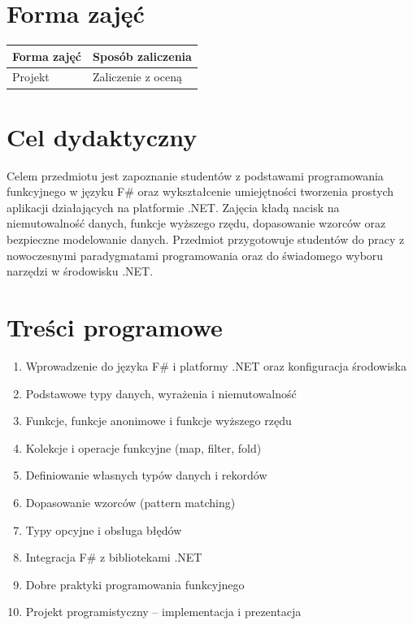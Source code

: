 \documentclass[12pt, a4paper]{article}
\begin{document}
\section{Forma zajęć}

\begin{tabular}{ll}
  \hline
  \textbf{Forma zajęć} & \textbf{Sposób zaliczenia} \\
  \hline
  Projekt & Zaliczenie z oceną \\
  \hline
\end{tabular}

\section{Cel dydaktyczny}

Celem przedmiotu jest zapoznanie studentów z podstawami programowania funkcyjnego w języku F\# oraz wykształcenie umiejętności tworzenia prostych aplikacji działających na platformie .NET. Zajęcia kładą nacisk na niemutowalność danych, funkcje wyższego rzędu, dopasowanie wzorców oraz bezpieczne modelowanie danych. Przedmiot przygotowuje studentów do pracy z nowoczesnymi paradygmatami programowania oraz do świadomego wyboru narzędzi w środowisku .NET.

\section{Treści programowe}

\begin{enumerate}
  \item Wprowadzenie do języka F\# i platformy .NET oraz konfiguracja środowiska
  \item Podstawowe typy danych, wyrażenia i niemutowalność
  \item Funkcje, funkcje anonimowe i funkcje wyższego rzędu
  \item Kolekcje i operacje funkcyjne (map, filter, fold)
  \item Definiowanie własnych typów danych i rekordów
  \item Dopasowanie wzorców (pattern matching)
  \item Typy opcyjne i obsługa błędów
  \item Integracja F\# z bibliotekami .NET
  \item Dobre praktyki programowania funkcyjnego
  \item Projekt programistyczny – implementacja i prezentacja
\end{enumerate}
\end{document}
